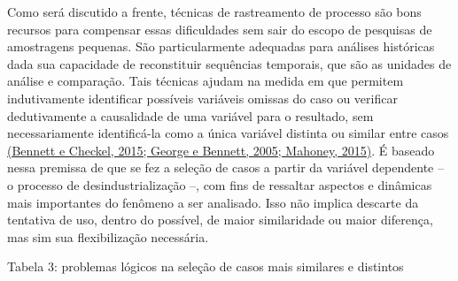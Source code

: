 Como será discutido a frente, técnicas de rastreamento de processo são
bons recursos para compensar essas dificuldades sem sair do escopo de
pesquisas de amostragens pequenas. São particularmente adequadas para
análises históricas dada sua capacidade de reconstituir sequências
temporais, que são as unidades de análise e comparação. Tais técnicas
ajudam na medida em que permitem indutivamente identificar possíveis
variáveis omissas do caso ou verificar dedutivamente a causalidade de
uma variável para o resultado, sem necessariamente identificá-la como a
única variável distinta ou similar entre casos
\href{https://www.zotero.org/google-docs/?gMzrvD}{(Bennett e Checkel,
2015; George e Bennett, 2005; Mahoney, 2015)}. É baseado nessa premissa
de que se fez a seleção de casos a partir da variável dependente -- o
processo de desindustrialização --, com fins de ressaltar aspectos e
dinâmicas mais importantes do fenômeno a ser analisado. Isso não implica
descarte da tentativa de uso, dentro do possível, de maior similaridade
ou maior diferença, mas sim sua flexibilização necessária.

Tabela 3: problemas lógicos na seleção de casos mais similares e
distintos


